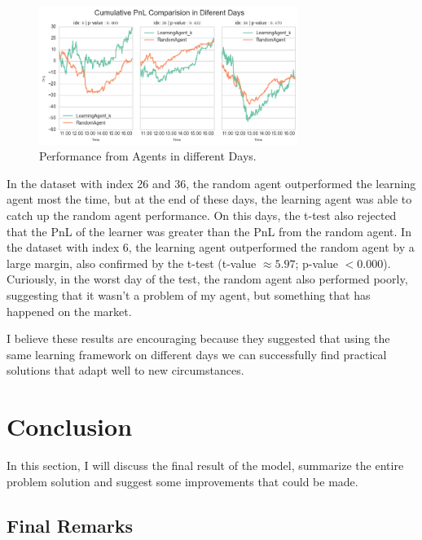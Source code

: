 \documentclass[a4paper]{article}
\begin{document}
\begin{figure}[ht]
\centering
\includegraphics[width=0.75\textwidth]{figures/pnl_diff_days_compare.png}
\caption{\label{fig:pnl_diff_days_compare}Performance from Agents in different Days.}
\end{figure}

In the dataset with index 26 and 36, the random agent outperformed the learning agent most the time, but at the end of these days, the learning agent was able to catch up the random agent performance.
On this days, the t-test also rejected that the PnL of the learner was greater than the PnL from the random agent. In the dataset with index 6, the learning agent outperformed the random agent by a large margin, also confirmed by the t-test (t-value $\approx 5.97$;  p-value $< 0.000$). Curiously, in the worst day of the test, the random agent also performed poorly, suggesting that it wasn't a problem of my agent, but something that has happened on the market.

I believe these results are encouraging because they suggested that using the same learning framework on different days we can successfully find practical solutions that adapt well to new circumstances.


\section{Conclusion}
\label{sec:conclusion}

In this section, I will discuss the final result of the model, summarize the entire problem solution and suggest some improvements that could be made.

\subsection{Final Remarks}
\end{document}
